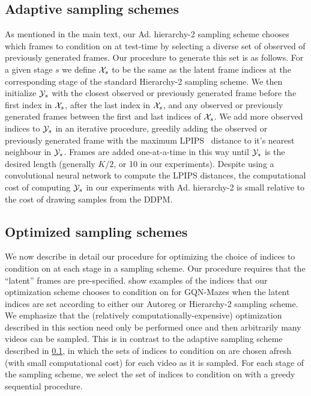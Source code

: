 \subsection{Adaptive sampling schemes} \label{ap:fdm-adaptive}
As mentioned in the main text, our Ad. hierarchy-2 sampling scheme chooses which frames to condition on at test-time by selecting a diverse set of observed of previously generated frames. Our procedure to generate this set is as follows. For a given stage $s$ we define $\mathcal{X}_s$ to be the same as the latent frame indices at the corresponding stage of the standard Hierarchy-2 sampling scheme. We then initialize $\mathcal{Y}_s$ with the closest observed or previously generated frame before the first index in $\mathcal{X}_s$, after the last index in $\mathcal{X}_s$, and any observed or previously generated frames between the first and last indices of $\mathcal{X}_s$. We add more observed indices to $\mathcal{Y}_s$ in an iterative procedure, greedily adding the observed or previously generated frame with the maximum LPIPS~\cite{zhang2018unreasonable} distance to it's nearest neighbour in $\mathcal{Y}_s$. Frames are added one-at-a-time in this way until $\mathcal{Y}_s$ is the desired length (generally $K/2$, or 10 in our experiments). Despite using a convolutional neural network to compute the LPIPS distances, the computational cost of computing $\mathcal{Y}_s$ in our experiments with Ad. hierarchy-2 is small relative to the cost of drawing samples from the DDPM.


\subsection{Optimized sampling schemes}
We now describe in detail our procedure for optimizing the choice of indices to condition on at each stage in a sampling scheme. Our procedure requires that the ``latent'' frames are pre-specified.  show examples of the indices that our optimization scheme chooses to condition on for GQN-Mazes when the latent indices are set according to either our Autoreg or Hierarchy-2 sampling scheme. We emphasize that the (relatively computationally-expensive) optimization described in this section need only be performed once and then arbitrarily many videos can be sampled. This is in contrast to the adaptive sampling scheme described in \cref{ap:fdm-adaptive}, in which the sets of indices to condition on are chosen afresh (with small computational cost) for each video as it is sampled. For each stage of the sampling scheme, we select the set of indices to condition on with a greedy sequential procedure. 

